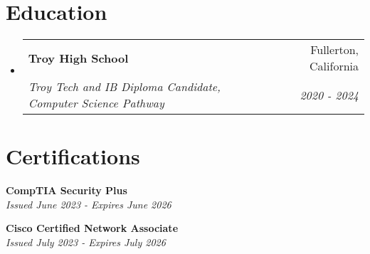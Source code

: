 \documentclass[letterpaper,11pt]{article}
\makeatletter
\newcommand{\resumeItem}[1]{
  \item\small{
    {#1 \vspace{-2pt}}
  }
}
\newcommand{\resumeSubheading}[4]{
  \vspace{-2pt}\item
    \begin{tabular*}{0.97\textwidth}[t]{l@{\extracolsep{\fill}}r}
      \textbf{#1} & #2 \\
      \textit{\small#3} & \textit{\small #4} \\
    \end{tabular*}\vspace{-7pt}
}
\newcommand{\resumeProjectHeading}[2]{
    \item
    \begin{tabular*}{0.97\textwidth}{l@{\extracolsep{\fill}}r}
      \small#1 & #2 \\
    \end{tabular*}\vspace{-7pt}
}
\newcommand{\resumeSubHeadingListStart}{\begin{itemize}[leftmargin=0.15in, label={}]}
\newcommand{\resumeSubHeadingListEnd}{\end{itemize}}
\newcommand{\resumeItemListStart}{\begin{itemize}}
\newcommand{\resumeItemListEnd}{\end{itemize}\vspace{-5pt}}
\makeatother
\begin{document}

\section{Education}
  \resumeSubHeadingListStart
    \resumeSubheading
      {Troy High School}{Fullerton, California}
      {Troy Tech and IB Diploma Candidate, Computer Science Pathway}{2020 - 2024}
  \resumeSubHeadingListEnd

\section{Certifications}
  \begin{itemize}[leftmargin=0.15in, label={}]
    \small{\item{
     \textbf{CompTIA Security Plus} \\
     \textit{Issued June 2023 - Expires June 2026} \\
    }}
 \end{itemize}
\begin{itemize}[leftmargin=0.15in, label={}]
    \small{\item{
     \textbf{Cisco Certified Network Associate} \\
     \textit{Issued July 2023 - Expires July 2026} \\
    }}
 \end{itemize}



\end{document}
